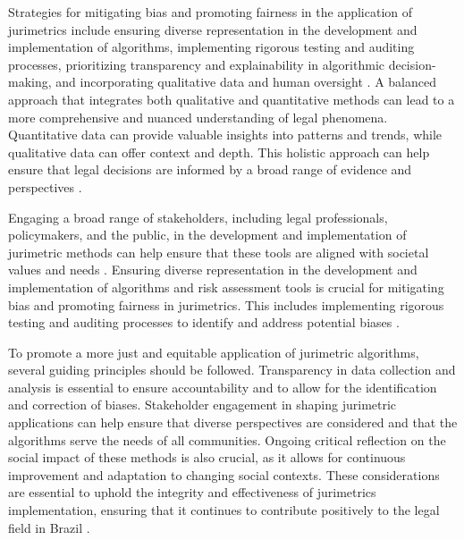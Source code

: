 Strategies for mitigating bias and promoting fairness in the application of jurimetrics include ensuring diverse representation in the development and implementation of algorithms, implementing rigorous testing and auditing processes, prioritizing transparency and explainability in algorithmic decision-making, and incorporating qualitative data and human oversight \cite{10.1590/data.2022.65.3.267,10.1080/07329113.2015.1046739}. A balanced approach that integrates both qualitative and quantitative methods can lead to a more comprehensive and nuanced understanding of legal phenomena. Quantitative data can provide valuable insights into patterns and trends, while qualitative data can offer context and depth. This holistic approach can help ensure that legal decisions are informed by a broad range of evidence and perspectives \cite{unger2021process}.

Engaging a broad range of stakeholders, including legal professionals, policymakers, and the public, in the development and implementation of jurimetric methods can help ensure that these tools are aligned with societal values and needs \cite{unger2021process}. Ensuring diverse representation in the development and implementation of algorithms and risk assessment tools is crucial for mitigating bias and promoting fairness in jurimetrics. This includes implementing rigorous testing and auditing processes to identify and address potential biases \cite{10.1590/data.2022.65.3.267,10.1057/s41599-020-00557-0}.

To promote a more just and equitable application of jurimetric algorithms, several guiding principles should be followed. Transparency in data collection and analysis is essential to ensure accountability and to allow for the identification and correction of biases. Stakeholder engagement in shaping jurimetric applications can help ensure that diverse perspectives are considered and that the algorithms serve the needs of all communities. Ongoing critical reflection on the social impact of these methods is also crucial, as it allows for continuous improvement and adaptation to changing social contexts. These considerations are essential to uphold the integrity and effectiveness of jurimetrics implementation, ensuring that it continues to contribute positively to the legal field in Brazil \cite{10.1007/s11186-021-09453-1,international2015,10.3390/fi9040068,10.1080/07329113.2015.1046739}.

